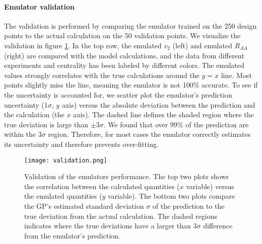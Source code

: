 \paragraph{Emulator validation} 
The validation is performed by comparing the emulator trained on the 250 design points to the actual calculation on the 50 validation points.
We visualize the validation in figure \ref{fig:new:validation}.
In the top row, the emulated $v_2$ (left) and emulated $R_{AA}$ (right) are compared with the model calculations, and the data from different experiments and centrality has been labeled by different colors.
The emulated values strongly correlates with the true calculations around the $y=x$ line.
Most points slightly miss the line, meaning the emulator is not 100\% accurate.
To see if the uncertainty is accounted for, we scatter plot the emulator's prediction uncertainty ($1\sigma$, $y$ axis) versus the absolute deviation between the prediction and the calculation (the $x$ axis).
The dashed line defines the shaded region where the true deviation is large than $\pm 3\sigma$.
We found that over $99\%$ of the prediction are within the $3\sigma$ region.
Therefore, for most cases the emulator correctly estimates its uncertainty  and therefore prevents over-fitting.

\begin{figure}
\singlespacing
\centering
\texttt{[image: validation.png]}
\caption[Validation of the emulators performance. The top two plots shows]{Validation of the emulators performance. The top two plots shows the correlation between the calculated quantities ($x$ variable) versus the emulated quantities ($y$ variable). The bottom two plots compare the GP's estimated standard deviation $\sigma$ of the prediction to the true deviation from the actual calculation. The dashed regions indicates where the true deviations have a larger than $3\sigma$ difference from the emulator's prediction.}
\label{fig:new:validation}
\end{figure}

